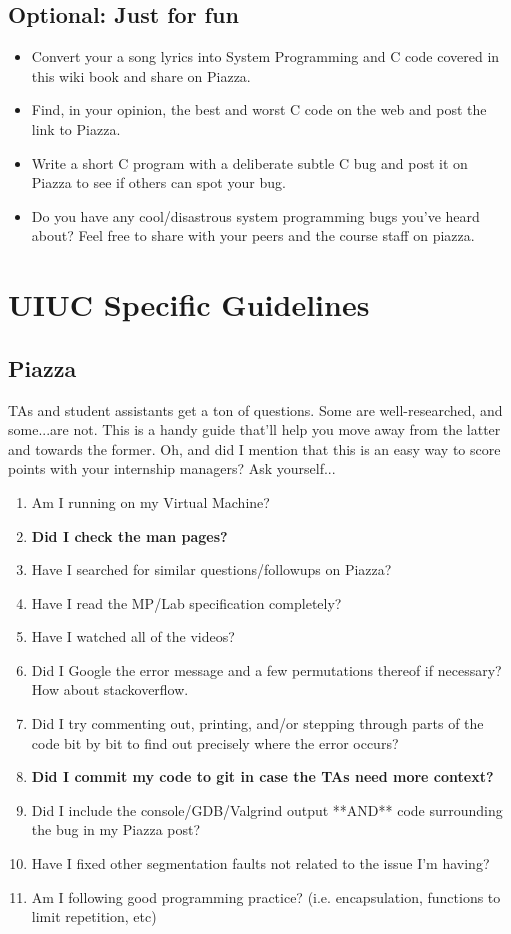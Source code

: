 \subsection{Optional: Just for fun}

\begin{itemize}
\item Convert your a song lyrics into System Programming and C code covered in this wiki book and share on Piazza.
\item Find, in your opinion, the best and worst C code on the web and post the link to Piazza.
\item Write a short C program with a deliberate subtle C bug and post it on Piazza to see if others can spot your bug.
\item Do you have any cool/disastrous system programming bugs you've heard about? Feel free to share with your peers and the course staff on piazza.
\end{itemize}

\section{UIUC Specific Guidelines}

\subsection{Piazza}

TAs and student assistants get a ton of questions.
Some are well-researched, and some...are not.
This is a handy guide that'll help you move away from the latter and towards the former.
Oh, and did I mention that this is an easy way to score points with your internship managers? Ask yourself...

\begin{enumerate}
\item Am I running on my Virtual Machine?
\item \textbf{Did I check the man pages?}
\item Have I searched for similar questions/followups on Piazza?
\item Have I read the MP/Lab specification completely?
\item Have I watched all of the videos?
\item Did I Google the error message and a few permutations thereof if necessary? How about stackoverflow.
\item Did I try commenting out, printing, and/or stepping through parts of the code bit by bit to find out precisely where the error occurs?
\item \textbf{Did I commit my code to git in case the TAs need more context?}
\item Did I include the console/GDB/Valgrind output **AND** code surrounding the bug in my Piazza post?
\item Have I fixed other segmentation faults not related to the issue I'm having?
\item Am I following good programming practice? (i.e. encapsulation, functions to limit repetition, etc)
\end{enumerate}

